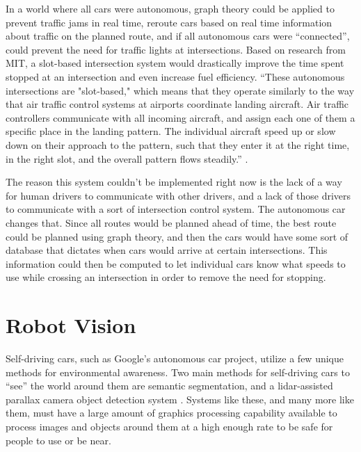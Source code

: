 \documentclass[12pt]{article}
\begin{document}
In a world where all cars were autonomous, graph theory could be applied to prevent traffic jams in real time, reroute cars based on real time information about traffic on the planned route, and if all autonomous cars were “connected”, could prevent the need for traffic lights at intersections. Based on research from MIT, a slot-based intersection system would drastically improve the time spent stopped at an intersection and even increase fuel efficiency. “These autonomous intersections are "slot-based," which means that they operate similarly to the way that air traffic control systems at airports coordinate landing aircraft. Air traffic controllers communicate with all incoming aircraft, and assign each one of them a specific place in the landing pattern. The individual aircraft speed up or slow down on their approach to the pattern, such that they enter it at the right time, in the right slot, and the overall pattern flows steadily.” \cite{AutonomousIntersections}
.\newline

The reason this system couldn’t be implemented right now is the lack of a way for human drivers to communicate with other drivers, and a lack of those drivers to communicate with a sort of intersection control system. The autonomous car changes that. Since all routes would be planned ahead of time, the best route could be planned using graph theory, and then the cars would have some sort of database that dictates when cars would arrive at certain intersections. This information could then be computed to let individual cars know what speeds to use while crossing an intersection in order to remove the need for stopping.



\section{Robot Vision}

Self-driving cars, such as Google’s autonomous car project, utilize a few unique methods for environmental awareness. Two main methods for self-driving cars to “see” the world around them are semantic segmentation, and a lidar-assisted parallax camera object detection system \cite{eRoad}. Systems like these, and many more like them, must have a large amount of graphics processing capability available to process images and objects around them at a high enough rate to be safe for people to use or be near\cite{Eigenfaces}.\newline 
\end{document}
